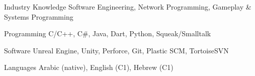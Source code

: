 

\begin{cvskills}

  \cvskill
  {Industry Knowledge}
  {Software Engineering, Network Programming, Gameplay \& Systems Programming} %

  \cvskill
    {Programming} %
    {C/C++, C\#, Java, Dart, Python, Squeak/Smalltalk} %

  \cvskill
    {Software} %
    {Unreal Engine, Unity, Perforce, Git, Plastic SCM, TortoiseSVN} %

  \cvskill
    {Languages} %
    {Arabic (native), English (C1), Hebrew (C1)} %

\end{cvskills}